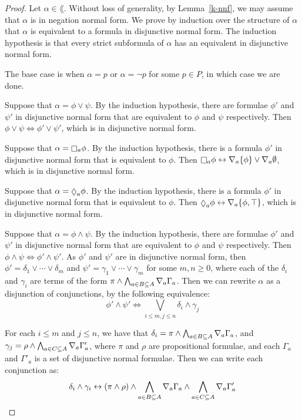 \begin{proof}
Let $\alpha \in \lang$. Without loss of generality, by Lemma~\ref{k-nnf}, we may
assume that $\alpha$ is in negation normal form. We prove by induction over the
structure of $\alpha$ that $\alpha$ is equivalent to a formula in disjunctive
normal form. The induction hypothesis is that every strict subformula of
$\alpha$ has an equivalent in disjunctive normal form.

The base case is when $\alpha = p$ or $\alpha = \neg p$ for some $p \in P$, in
which case we are done.

Suppose that $\alpha = \phi \lor \psi$. By the induction hypothesis, there are
formulae $\phi'$ and $\psi'$ in disjunctive normal form that are equivalent to
$\phi$ and $\psi$ respectively. Then $\phi \lor \psi \iff \phi' \lor \psi'$,
which is in disjunctive normal form.

Suppose that $\alpha = \knows_a \phi$. By the induction hypothesis, there is a
formula $\phi'$ in disjunctive normal form that is equivalent to $\phi$. Then
$\knows_a \phi \iff \covers_a \{\phi\} \lor \covers_a \emptyset$, which is in
disjunctive normal form.

Suppose that $\alpha = \suspects_a \phi$. By the induction hypothesis, there is
a formula $\phi'$ in disjunctive normal form that is equivalent to $\phi$. Then
$\suspects_a \phi \iff \covers_a \{\phi, \top\}$, which is in disjunctive normal
form.

Suppose that $\alpha = \phi \land \psi$. By the induction hypothesis, there are
formulae $\phi'$ and $\psi'$ in disjunctive normal form that are equivalent to
$\phi$ and $\psi$ respectively. Then $\phi \land \psi \iff \phi' \land \psi'$.
As $\phi'$ and $\psi'$ are in disjunctive normal form, then $\phi' = \delta_1
\lor \cdots \lor \delta_m$ and $\psi' = \gamma_1 \lor \cdots \lor \gamma_m$ for
some $m, n \geq 0$, where each of the $\delta_i$ and $\gamma_i$ are terms of the
form $\pi \land \bigwedge_{a \in B \subseteq A} \nabla_a \Gamma_a$.  Then we
can rewrite $\alpha$ as a disjunction of conjunctions, by the following
equivalence:
$$
\phi' \land \psi' \iff \bigvee_{i \leq m, j \leq n} \delta_i \land \gamma_j
$$

For each $i \leq m$ and $j \leq n$, we have that $\delta_i = \pi \land
\bigwedge_{a \in B \subseteq A} \nabla_a \Gamma_a$, and $\gamma_j = \rho \land
\bigwedge_{a \in C \subseteq A} \nabla_a \Gamma'_a$, where $\pi$ and $\rho$ are
propositional formulae, and each $\Gamma_a$ and $\Gamma'_a$ is a set of
disjunctive normal formulae. Then we can write each conjunction as: 
$$\delta_i \land \gamma_i \leftrightarrow (\pi \land \rho) \land \bigwedge_{a \in B
\subseteq A} \nabla_a \Gamma_a \land \bigwedge_{a \in C \subseteq A} \nabla_a
\Gamma'_a$$


\end{proof}
